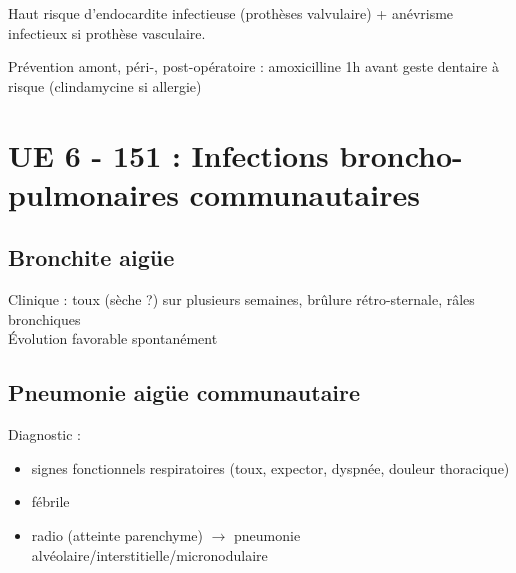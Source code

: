 Haut risque d'endocardite infectieuse (prothèses valvulaire) + anévrisme
infectieux si prothèse vasculaire.

Prévention amont, péri-, post-opératoire : 
amoxicilline 1h avant geste dentaire à risque (clindamycine si allergie)

\section{UE 6 - 151 : Infections broncho-pulmonaires communautaires}

\subsection{Bronchite aigüe}

Clinique : toux (sèche ?) sur plusieurs semaines, brûlure
rétro-sternale, râles bronchiques\\
Évolution favorable spontanément

\subsection{Pneumonie aigüe communautaire}

Diagnostic :

\begin{itemize}
\item signes fonctionnels respiratoires (toux, expector, dyspnée, douleur
  thoracique)
\item fébrile
\item radio (atteinte parenchyme) $\to$ pneumonie
  alvéolaire/interstitielle/micronodulaire
\end{itemize}

